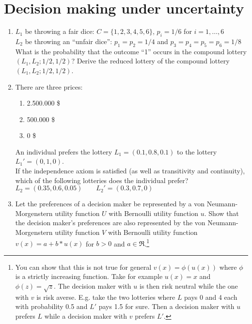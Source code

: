 \documentclass[a4paper,12pt]{article}
\begin{document}
\section{Decision making under uncertainty}
\label{sec:decis-making-under}

\begin{enumerate}[resume]
  \item $L_1$ be throwing a fair dice: $C=\{1,2,3,4,5,6\}$, $p_i=1/6$ for $i=1,\dots,6$\\
$L_2$ be throwing an ``unfair dice'': $p_1=p_2=1/4$ and $p_3=p_4=p_5=p_6=1/8$\\
What is the probability that the outcome ``1'' occurs in the compound lottery $(L_1,L_2;1/2,1/2)$? Derive the reduced lottery of the compound lottery $(L_1,L_2;1/2,1/2)$.
 \item  There are three prices:
  \begin{enumerate}
  \item 2.500.000 \$
  \item 500.000 \$
  \item 0 \$
  \end{enumerate}
An individual prefers the lottery $L_1=(0.1,0.8,0.1)$ to the lottery $L_1'=(0,1,0)$.\\
If the independence axiom is satisfied (as well as transitivity and continuity), which of the following lotteries does the individual prefer?\\
$L_2=(0.35,0.6,0.05)\qquad L_2'=(0.3,0.7,0)$
  \item Let the preferences of a decision maker be represented by a von Neumann-Morgenstern utility function $U$ with Bernoulli utility function $u$. Show that the decision maker's preferences are also represented by the von Neumann-Morgenstern utility function $V$ with Bernoulli utility function $v(x)=a+b*u(x)$ for $b>0$ and $a\in \Re$.\footnote{You can show that this is not true for general $v(x)=\phi(u(x))$ where $\phi$ is a strictly increasing function. Take for example $u(x)=x$ and $\phi(z)=\sqrt{z}$. The decision maker with $u$ is then risk neutral while the one with $v$ is risk averse. E.g. take the two lotteries where $L$ pays 0 and 4 each with probability 0.5 and $L'$ pays 1.5 for sure. Then a decision maker with $u$ prefers $L$ while a decision maker with $v$ prefers $L'$. }

\end{enumerate}
\end{document}
